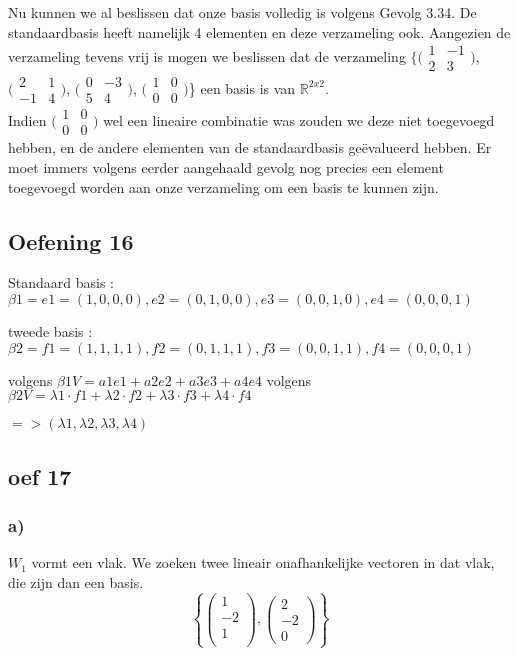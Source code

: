 \documentclass[lineaire_algebra_oplossingen.tex]{subfiles}
\begin{document}
Nu kunnen we al beslissen dat onze basis volledig is volgens Gevolg 3.34. De standaardbasis heeft namelijk 4 elementen en deze verzameling ook. Aangezien de verzameling tevens vrij is mogen we beslissen dat de verzameling $\{\bigl(
\begin{smallmatrix}
1&-1\\ 2&3
\end{smallmatrix}
\bigr)$,
$\bigl(
\begin{smallmatrix}
2&1\\ -1&4
\end{smallmatrix}
\bigr)$,
$\bigl(
\begin{smallmatrix}
0&-3\\ 5&4
\end{smallmatrix}
\bigr)$,
$\bigl(
\begin{smallmatrix}
1&0\\ 0&0
\end{smallmatrix}
\bigr)$\} een basis is van $\mathbb{R}^{2x2}$.\\

Indien $\bigl(
\begin{smallmatrix}
1&0\\ 0&0
\end{smallmatrix}
\bigr)$ wel een lineaire combinatie was zouden we deze niet toegevoegd hebben, en de andere elementen van de standaardbasis ge\"evalueerd hebben. Er moet immers volgens eerder aangehaald gevolg nog precies een element toegevoegd worden aan onze verzameling om een basis te kunnen zijn.

\subsection{Oefening 16}

Standaard basis : $\beta1 = {e1 =(1,0,0,0), e2 =(0,1,0,0), e3 = (0,0,1,0), e4 = (0,0,0,1) }$

tweede basis : $\beta2 = {f1 = (1,1,1,1), f2 =(0,1,1,1), f3 = (0,0,1,1), f4= (0,0,0,1) }$

volgens $\beta1  V = a1e1 + a2e2 + a3e3 + a4e4$
volgens $\beta2 V = \lambda1 \cdot f1 + \lambda2 \cdot f2 + \lambda3 \cdot f3 + \lambda4 \cdot f4 $ 

$=> (\lambda1, \lambda2, \lambda3, \lambda4) $

\subsection{oef 17}
\subsubsection*{a)}
$W_1$ vormt een vlak. We zoeken twee lineair onafhankelijke vectoren in dat vlak, die zijn dan een basis.
\[
\left\lbrace
\begin{pmatrix}
1\\-2\\1\\
\end{pmatrix}
,
\begin{pmatrix}
2\\-2\\0
\end{pmatrix}
\right\rbrace
\]
\end{document}
